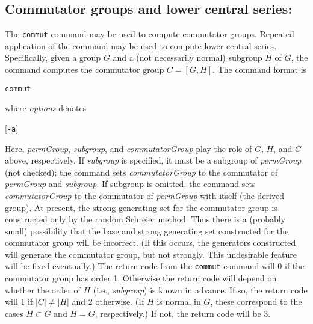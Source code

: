 \subsection{Commutator groups and lower central series:}The {\tt commut}
command may be used to compute commutator groups.  Repeated application of
the command may be used to compute lower central series.  Specifically, given
a group $G$ and a (not necessarily normal) subgroup $H$ of $G$, the command
computes the commutator group $C = [G,H]$.  The command format is
%
\smallskip
\centerline{{\tt commut}\quad
                        [{\it subgroup\/}]}
\smallskip
where {\it options\/} denotes
\smallskip
\centerline{
        [{\tt -a}]\enskip
        [{\tt -i}]\enskip
        [{\tt -mb:}$k$]\enskip
        [{\tt -mw:}$w$]\enskip
        [{\tt -n:}{\it name}]\enskip
        [{\tt -p:}{\it path\/}]\enskip
        [{\tt -q}]}
\smallskip
Here, {\it permGroup\/}, {\it subgroup\/}, and {\it commutatorGroup\/}
play the role of $G$, $H$, and $C$ above, respectively.
If {\it subgroup\/} is specified, it must be a subgroup of {\it permGroup\/}
(not checked); the command sets {\it commutatorGroup\/}
to the commutator of {\it permGroup\/} and {\it subgroup}.  If subgroup is
omitted, the command sets {\it commutatorGroup\/} to the commutator of
{\it permGroup\/} with itself (the derived group). 
\medbreak
At present, the strong generating set for the commutator group is
constructed only by the random Schreier method.  Thus there is a
(probably small) possibility that the base and strong generating set 
constructed for the commutator group will be incorrect.  (If this
occurs, the generators constructed will generate the commutator group, but
not strongly.  This undesirable feature will be fixed eventually.)
\medbreak
The return code from the {\tt commut} command will 0 if the commutator group
has order 1.  
Otherwise the return code will depend on  whether the order of $H$ (i.e.,
{\it subgroup\/})
is known in advance.  If so, the return code will  1 if $\vert C\vert \neq
\vert H\vert$ and 2 otherwise.  (If $H$ is normal in $G$, these correspond
to the cases $H \subset G$ and $H = G$, respectively.)  If not, the return
code will be 3. 
%
%
%
